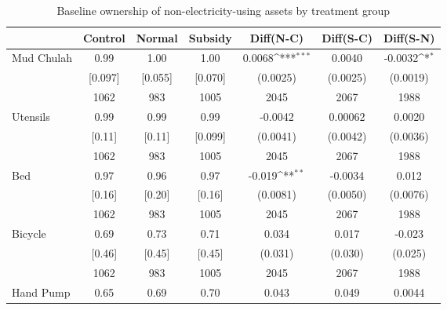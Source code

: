 \begin{table}[htbp]\centering
\def\sym#1{\ifmmode^{#1}\else\(^{#1}\)\fi}
\caption{Baseline ownership of non-electricity-using assets by treatment group \label{tab:"balance"}}
\begin{tabular*}{1\hsize}{@{\hskip\tabcolsep\extracolsep\fill}l*{1}{cccccc}}
\toprule
                                &  Control&   Normal&  Subsidy&Diff(N-C)         &Diff(S-C)         &Diff(S-N)         \\
\midrule
Mud Chulah                      &     0.99&     1.00&     1.00&   0.0068\sym{***}&   0.0040         &  -0.0032\sym{*}  \\
                                &  [0.097]&  [0.055]&  [0.070]& (0.0025)         & (0.0025)         & (0.0019)         \\
                                &     1062&      983&     1005&     2045         &     2067         &     1988         \\
Utensils                        &     0.99&     0.99&     0.99&  -0.0042         &  0.00062         &   0.0020         \\
                                &   [0.11]&   [0.11]&  [0.099]& (0.0041)         & (0.0042)         & (0.0036)         \\
                                &     1062&      983&     1005&     2045         &     2067         &     1988         \\
Bed                             &     0.97&     0.96&     0.97&   -0.019\sym{**} &  -0.0034         &    0.012         \\
                                &   [0.16]&   [0.20]&   [0.16]& (0.0081)         & (0.0050)         & (0.0076)         \\
                                &     1062&      983&     1005&     2045         &     2067         &     1988         \\
Bicycle                         &     0.69&     0.73&     0.71&    0.034         &    0.017         &   -0.023         \\
                                &   [0.46]&   [0.45]&   [0.45]&  (0.031)         &  (0.030)         &  (0.025)         \\
                                &     1062&      983&     1005&     2045         &     2067         &     1988         \\
Hand Pump                       &     0.65&     0.69&     0.70&    0.043         &    0.049         &   0.0044         \\

\end{tabular*}
\end{table}
